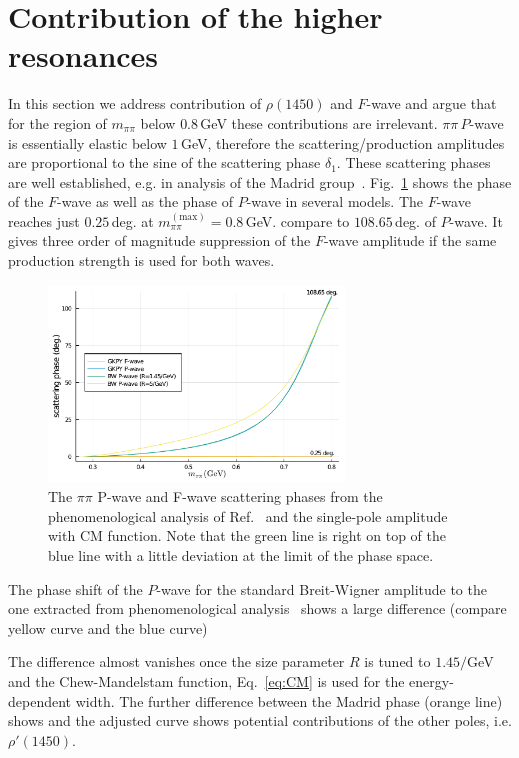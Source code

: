 \documentclass[aps,prd,superscriptaddress,onecolumn,nofootinbib,preprintnumbers,notitlepage]{revtex4-1}
\begin{document}
\newpage

\appendix

\section{Contribution of the higher resonances}
In this section we address contribution of $\rho(1450)$ and $F$-wave
and argue that for the region of $m_{\pi\pi}$ below $0.8\,$GeV these contributions
are irrelevant. $\pi\pi\,P$-wave is essentially elastic below $1\,$GeV,
therefore the scattering/production amplitudes are proportional
to the sine of the scattering phase $\delta_1$.
These scattering phases are well established, e.g. in analysis of the Madrid group~\cite{GarciaMartin:2011cn}.
Fig.~\ref{fig:scatt.phases} shows the phase of the $F$-wave as well as the phase
of $P$-wave in several models. The $F$-wave reaches just $0.25\,$deg. at $m_{\pi\pi}^{(\text{max})}=0.8\,$GeV. compare to $108.65\,$deg. of $P$-wave.
It gives three order of magnitude suppression of the $F$-wave amplitude if the same production strength is used for both waves.
\begin{figure}
  \includegraphics[width=0.7\textwidth]{Pwave_phaseshift.pdf}
  \caption{The $\pi\pi$ P-wave and F-wave scattering phases from the phenomenological analysis of Ref.~\cite{GarciaMartin:2011cn} and the single-pole amplitude with CM function.
  Note that the green line is right on top of the blue line with a little deviation at the limit of the phase space.}
  \label{fig:scatt.phases}
\end{figure}

The phase shift of the $P$-wave for the standard Breit-Wigner amplitude to the one extracted from phenomenological analysis~\cite{GarciaMartin:2011cn} shows a large difference (compare yellow curve and the blue curve)

The difference almost vanishes once the size parameter $R$ is tuned to $1.45/$GeV and the Chew-Mandelstam function, Eq.~\eqref{eq:CM} is used for the energy-dependent width.
The further difference between the Madrid phase (orange line) shows and the adjusted curve
shows potential contributions of the other poles, i.e. $\rho'(1450)$.
\end{document}
